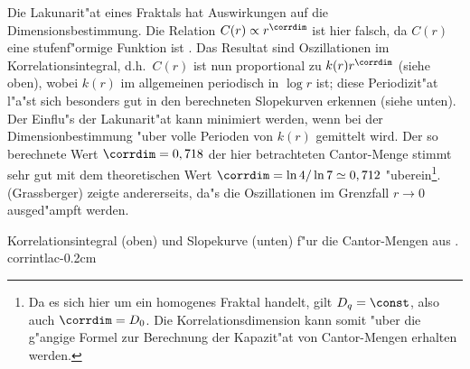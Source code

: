 Die Lakunarit"at eines Fraktals hat Auswirkungen auf die Dimensionsbestimmung. Die
Relation $C(r)\propto r^\corrdim$ ist hier falsch, da $C(r)$ eine stufenf"ormige Funktion
ist \cite{Broggi88}.  Das Resultat sind Oszillationen im Korrelationsintegral, d.h.\ 
$C(r)$ ist nun proportional zu $k(r)r^\corrdim$ (siehe  oben), wobei
$k(r)$ im allgemeinen periodisch in $\log r$ ist; diese Periodizit"at l"a"st sich
besonders gut in den berechneten Slopekurven erkennen (siehe \psref{corrintlac} unten).
Der Einflu"s der Lakunarit"at kann minimiert werden, wenn bei der Dimensionbestimmung
"uber volle Perioden von $k(r)$ gemittelt wird. Der so berechnete Wert $\corrdim=0,718$
der hier betrachteten Cantor-Menge 
stimmt sehr gut mit dem theoretischen Wert $\corrdim=\ln4/\ln7\simeq 0,712$
"uberein\footnote{Da es sich hier um ein homogenes Fraktal handelt, gilt $D_q=\const$,
  also auch $\corrdim=D_0$. Die Korrelationsdimension kann somit "uber die g"angige Formel
  zur Berechnung der Kapazit"at von Cantor-Mengen erhalten werden.}.  \autor(Grassberger)
zeigte andererseits, da"s die Oszillationen im Grenzfall $r\to 0$ ausged"ampft
werden\cite{Grassberger88}.

{Korrelationsintegral (oben) und Slopekurve (unten) f"ur die Cantor-Mengen aus .
}{corrintlac}{-0.2cm}






